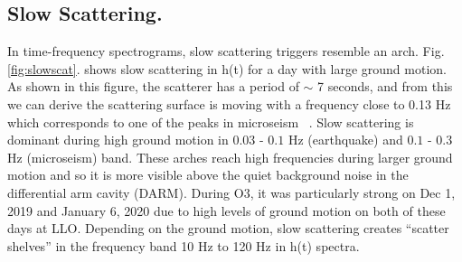 \documentclass[12pt]{iopart}
\begin{document}
\subsection{Slow Scattering.}
In time-frequency spectrograms, slow scattering triggers resemble an arch.  Fig. \ref{fig:slowscat}. shows slow scattering in h(t) for a day with large ground motion. As shown in this figure, the scatterer has a period of $\sim$ 7 seconds, and from this we can derive the scattering surface is moving with a frequency close to 0.13 Hz  which corresponds to one of the peaks in microseism ~\cite{alogsid}.
Slow scattering is  dominant during high ground motion in $0.03$ - $0.1$ Hz (earthquake) and $0.1$ - $0.3$  Hz (microseism) band. These arches reach high frequencies during larger ground motion and so it is more visible above the quiet background noise in the differential arm cavity (DARM). During O3, it was particularly strong on Dec 1, 2019 and January 6, 2020 due to high levels of ground motion on both of these days at LLO.  Depending on the ground motion, slow scattering creates ``scatter shelves'' in the frequency band 10 Hz to 120 Hz in h(t) spectra. 
\end{document}
